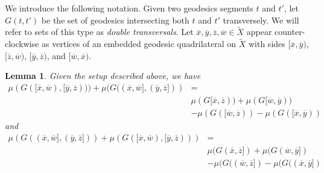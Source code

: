 \documentclass[12pt,article]{amsart}
\numberwithin{equation}{section}
\numberwithin{figure}{section}
\newtheorem{lemma}[equation]{Lemma}
\theoremstyle{definition}
\theoremstyle{plain}
\newcommand*{\wt}[1]{\widetilde{#1}}
\begin{document}
We introduce the following notation. Given two geodesics segments $t$ and $t'$, let $G(t , t')$ be the set of geodesics intersecting both $t$ and $t'$ transversely. We will refer to sets of this type as \emph{double transversals}.
Let $\overline{x},\overline{y},\overline{z},\overline{w} \in \wt{X}$ appear counter-clockwise as vertices of an embedded geodesic quadrilateral on $\wt{X}$ with sides $[\overline{x},\overline{y})$, $[\overline{z},\overline{w})$, $[\overline{y},\overline{z})$, and $[\overline{w},\overline{x})$.

\begin{lemma}
Given the setup described above, we have 
\begin{align*}
\mu(G([\overline{x},\overline{w}), [\overline{y},\overline{z}))) + \mu(G((\overline{x},\overline{w}], (\overline{y},\overline{z}])) &= \\
&\mu(G[\overline{x},\overline{z})) + \mu(G[\overline{w},\overline{y})) \\
&- \mu(G([\overline{w},\overline{z})) - \mu(G([\overline{x},\overline{y}))
\end{align*}
and
\begin{align*}
\mu(G((\overline{x},\overline{w}], (\overline{y},\overline{z}])) + \mu(G([\overline{x},\overline{w}), [\overline{y},\overline{z}))) &= \\
&\mu(G(\overline{x},\overline{z}]) + \mu(G(\overline{w},\overline{y}]) \\
&- \mu(G((\overline{w},\overline{z}]) - \mu(G((\overline{x},\overline{y}])
\end{align*}
\label{lem:otalclaim}
\end{lemma}
\end{document}
